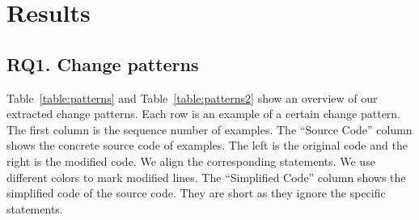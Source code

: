 \section{Results}
\label{sec:result}
\subsection{RQ1. Change patterns}
\label{sec:result:pattern}






Table~\ref{table:patterns} and Table~\ref{table:patterns2} show an overview of our extracted change patterns. Each row is an example of a certain change pattern. The first column is the sequence number of examples. The ``Source Code'' column shows the concrete source code of examples. The left is the original code and the right is the modified code. We align the corresponding statements. We use different colors to mark modified lines. The ``Simplified Code'' column shows the simplified code of the source code. They are short as they ignore the specific statements.

